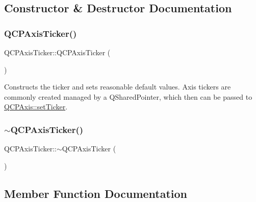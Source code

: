 \subsection{Constructor \& Destructor Documentation}
\mbox{\label{class_q_c_p_axis_ticker_a8fcf23c79ebd72202fe79253f9f01ea8}} 
\subsubsection{\texorpdfstring{QCPAxisTicker()}{QCPAxisTicker()}}
{\footnotesize\ttfamily Q\+C\+P\+Axis\+Ticker\+::\+Q\+C\+P\+Axis\+Ticker (\begin{DoxyParamCaption}{ }\end{DoxyParamCaption})}

Constructs the ticker and sets reasonable default values. Axis tickers are commonly created managed by a Q\+Shared\+Pointer, which then can be passed to \mbox{\hyperlink{class_q_c_p_axis_a4ee03fcd2c74d05cd1a419b9af5cfbdc}{Q\+C\+P\+Axis\+::set\+Ticker}}. \mbox{\label{class_q_c_p_axis_ticker_a1119d6f09ad720f9c5dfdd2559047161}} 
\subsubsection{\texorpdfstring{$\sim$QCPAxisTicker()}{~QCPAxisTicker()}}
{\footnotesize\ttfamily Q\+C\+P\+Axis\+Ticker\+::$\sim$\+Q\+C\+P\+Axis\+Ticker (\begin{DoxyParamCaption}{ }\end{DoxyParamCaption})\hspace{0.3cm}{\ttfamily [virtual]}}



\subsection{Member Function Documentation}
\mbox{\label{class_q_c_p_axis_ticker_ac7df6c72876b7abd67c932663a0b0f6a}} 
